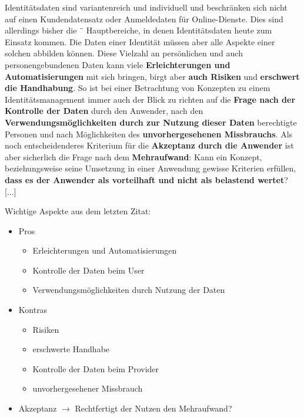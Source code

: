 \begin{Zitat}[Identitätsdaten]

Identitätsdaten sind variantenreich und individuell und beschränken sich nicht auf einen
Kundendatensatz oder Anmeldedaten für Online-Dienste. Dies sind allerdings bisher die ¨
Hauptbereiche, in denen Identitätsdaten heute zum Einsatz kommen. Die Daten einer
Identität müssen aber alle Aspekte einer solchen abbilden können. Diese Vielzahl an persönlichen und auch personengebundenen Daten kann viele \textbf{Erleichterungen und Automatisierungen} mit sich bringen, birgt aber \textbf{auch Risiken} und \textbf{erschwert die Handhabung}. So ist bei einer Betrachtung von Konzepten zu einem Identitätsmanagement immer auch der
Blick zu richten auf die \textbf{Frage nach der Kontrolle der Daten} durch den Anwender, nach den \textbf{Verwendungsmöglichkeiten durch zur Nutzung dieser Daten} berechtigte Personen und nach Möglichkeiten des \textbf{unvorhergesehenen Missbrauchs}. Als noch entscheidenderes Kriterium für die \textbf{Akzeptanz durch die Anwender} ist aber sicherlich die Frage nach dem \textbf{Mehraufwand}: Kann ein Konzept, beziehungsweise seine Umsetzung in einer Anwendung gewisse Kriterien erfüllen, \textbf{dass es der Anwender als vorteilhaft und nicht als belastend wertet}? [...]

\end{Zitat}

\vspace{0.3cm}

Wichtige Aspekte aus dem letzten Zitat:

\begin{itemize}
  \item Pros
  \begin{itemize}
    \item Erleichterungen und Automatisierungen
    \item Kontrolle der Daten beim User
    \item Verwendungsmöglichkeiten durch Nutzung der Daten
  \end{itemize}
  \item Kontras
  \begin{itemize}
    \item Risiken
    \item erschwerte Handhabe
    \item Kontrolle der Daten beim Provider
    \item unvorhergesehener Missbrauch
  \end{itemize}
  \item Akzeptanz $\rightarrow$ Rechtfertigt der Nutzen den Mehraufwand?
\end{itemize}

